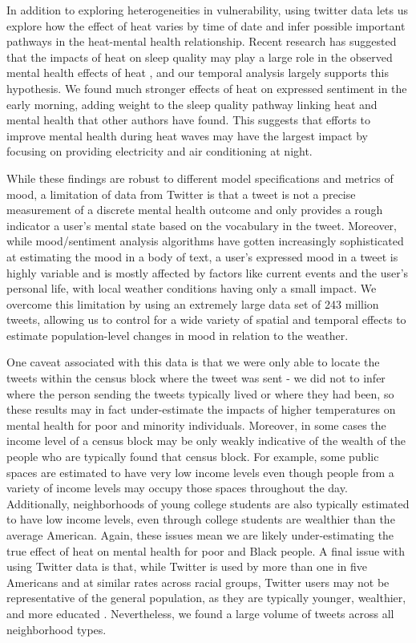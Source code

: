 \documentclass[fleqn,10pt]{wlscirep}
\begin{document}
In addition to exploring heterogeneities in vulnerability, using twitter data lets us explore how the effect of heat varies by time of date and infer possible important pathways in the heat-mental health relationship. Recent research has suggested that the impacts of heat on sleep quality may play a large role in the observed mental health effects of heat \cite{Obradovich2017May, Mullins2019Dec}, and our temporal analysis largely supports this hypothesis.  We found much stronger effects of heat on expressed sentiment in the early morning, adding weight to the sleep quality pathway linking heat and mental health that other authors have found.  This suggests that efforts to improve mental health during heat waves may have the largest impact by focusing on providing electricity and air conditioning at night.


While these findings are robust to different model specifications and metrics of mood, a limitation of data from Twitter is that a tweet is not a precise measurement of a discrete mental health outcome and only provides a rough indicator a user's mental state based on the vocabulary in the tweet. Moreover, while mood/sentiment analysis algorithms have gotten increasingly sophisticated at estimating the mood in a body of text, a user's expressed mood in a tweet is highly variable and is mostly affected by factors like current events and the user's personal life, with local weather conditions having only a small impact. We overcome this limitation by using an extremely large data set of 243 million tweets, allowing us to control for a wide variety of spatial and temporal effects to estimate population-level changes in mood in relation to the weather.

One caveat associated with this data is that we were only able to locate the tweets within the census block where the tweet was sent - we did not to infer where the person sending the tweets typically lived or where they had been, so these results may in fact under-estimate the impacts of higher temperatures on mental health for poor and minority individuals. Moreover, in some cases the income level of a census block may be only weakly indicative of the wealth of the people who are typically found that census block. For example, some public spaces are estimated to have very low income levels even though people from a variety of income levels may occupy those spaces throughout the day. Additionally, neighborhoods of young college students are also typically estimated to have low income levels, even through college students are wealthier than the average American. Again, these issues mean we are likely under-estimating the true effect of heat on mental health for poor and Black people. A final issue with using Twitter data is that, while Twitter is used by more than one in five Americans and at similar rates across racial groups, Twitter users may not be representative of the general population, as they are typically younger, wealthier, and more educated \cite{Pew2020Sep}. Nevertheless, we found a large volume of tweets across all neighborhood types.
\end{document}
